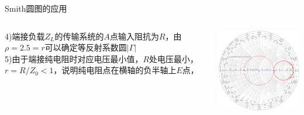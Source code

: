 \begin{frame}{Smith圆图的应用}
  \begin{columns}
    \begin{column}{0.4\linewidth}
      4)\quad 端接负载$Z_L$的传输系统的$A$点输入阻抗为$R$，由$\rho=2.5=r$可以确定等反射系数圆$\lvert\Gamma\rvert$\\
      5)\quad 由于端接纯电阻时对应电压最小值，$R$处电压最小，$r=R/Z_0<1$，说明纯电阻点在横轴的负半轴上$E$点，
    \end{column}
    \begin{column}{0.6\linewidth}
      \includegraphics[width=7cm]{fig4-17-6.pdf}
    \end{column}
  \end{columns}
\end{frame}

